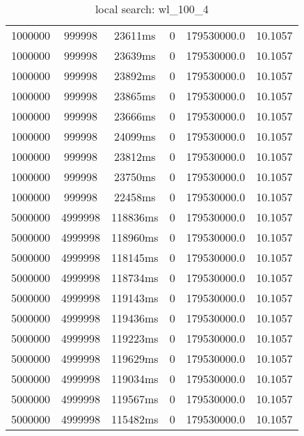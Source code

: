 \documentclass[./main.tex]{subfiles}
\begin{document}
\begin{table}
\begin{tabular}{ c | c | c | c | c | c }
        \rowcolor{lightgray} 1000000 & 999998 & 23611ms & 0 & 179530000.0 & 10.1057 \\
        \rowcolor{lightgray} 1000000 & 999998 & 23639ms & 0 & 179530000.0 & 10.1057 \\
        \rowcolor{lightgray} 1000000 & 999998 & 23892ms & 0 & 179530000.0 & 10.1057 \\
        \rowcolor{lightgray} 1000000 & 999998 & 23865ms & 0 & 179530000.0 & 10.1057 \\
        \rowcolor{lightgray} 1000000 & 999998 & 23666ms & 0 & 179530000.0 & 10.1057 \\
        \rowcolor{lightgray} 1000000 & 999998 & 24099ms & 0 & 179530000.0 & 10.1057 \\
        \rowcolor{lightgray} 1000000 & 999998 & 23812ms & 0 & 179530000.0 & 10.1057 \\
        \rowcolor{lightgray} 1000000 & 999998 & 23750ms & 0 & 179530000.0 & 10.1057 \\
        \rowcolor{lightgray} 1000000 & 999998 & 22458ms & 0 & 179530000.0 & 10.1057 \\
        \hline
        \rowcolor{lightgray} 5000000 & 4999998 & 118836ms & 0 & 179530000.0 & 10.1057 \\
        \rowcolor{lightgray} 5000000 & 4999998 & 118960ms & 0 & 179530000.0 & 10.1057 \\
        \rowcolor{lightgray} 5000000 & 4999998 & 118145ms & 0 & 179530000.0 & 10.1057 \\
        \rowcolor{lightgray} 5000000 & 4999998 & 118734ms & 0 & 179530000.0 & 10.1057 \\
        \rowcolor{lightgray} 5000000 & 4999998 & 119143ms & 0 & 179530000.0 & 10.1057 \\
        \rowcolor{lightgray} 5000000 & 4999998 & 119436ms & 0 & 179530000.0 & 10.1057 \\
        \rowcolor{lightgray} 5000000 & 4999998 & 119223ms & 0 & 179530000.0 & 10.1057 \\
        \rowcolor{lightgray} 5000000 & 4999998 & 119629ms & 0 & 179530000.0 & 10.1057 \\
        \rowcolor{lightgray} 5000000 & 4999998 & 119034ms & 0 & 179530000.0 & 10.1057 \\
        \rowcolor{lightgray} 5000000 & 4999998 & 119567ms & 0 & 179530000.0 & 10.1057 \\
        \rowcolor{lightgray} 5000000 & 4999998 & 115482ms & 0 & 179530000.0 & 10.1057 \\
    \end{tabular}
    \caption{local search: wl\_100\_4}
\end{table}
\end{document}
